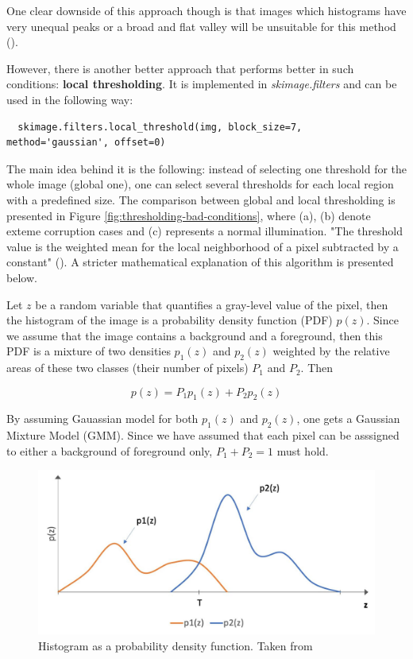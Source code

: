 One clear downside of this approach though is that images which histograms have very unequal peaks or a broad and flat valley will be unsuitable for this method (\cite{thresholding_skimage}).

However, there is another better approach that performs better in such conditions: \textbf{local thresholding}. It is implemented in \textit{skimage.filters} and can be used in the following way:

\begin{lstlisting}
  skimage.filters.local_threshold(img, block_size=7, method='gaussian', offset=0)
\end{lstlisting}

The main idea behind it is the following: instead of selecting one threshold for the whole image (global one), one can select several thresholds for each local region with a predefined size. The comparison between global and local thresholding is presented in Figure \ref{fig:thresholding-bad-conditions}, where (a), (b) denote exteme corruption cases and (c) represents a normal illumination. "The threshold value is the weighted mean for the local neighborhood of a pixel subtracted by a constant" (\cite{digital_image_book}). A stricter mathematical explanation of this algorithm is presented below.

Let $z$ be a random variable that quantifies a gray-level value of the pixel, then the histogram of the image is a probability density function (PDF) $p(z)$. Since we assume that the image contains a background and a foreground, then this PDF is a mixture of two densities $p_1(z)$ and $p_2(z)$ weighted by the relative areas of these two classes (their number of pixels) $P_1$ and $P_2$. Then 

\begin{equation}
    p(z) = P_1 p_1(z) + P_2 p_2(z)
\end{equation}

By assuming Gauassian model for both $p_1(z)$ and $p_2(z)$, one gets a Gaussian Mixture Model (GMM). Since we have assumed that each pixel can be asssigned to either a background of foreground only, $P_1 + P_2 = 1$ must hold. 

\begin{figure}[htb]
	\begin{center}
		\includegraphics[width=0.8\linewidth]{bilder/thresholding-global-min.jpg}
		\caption[Histogram as a probability density function]%
        {Histogram as a probability density function. Taken from \cite{digital_image_book}}\label{fig:gmm}
	\end{center}
\end{figure}

